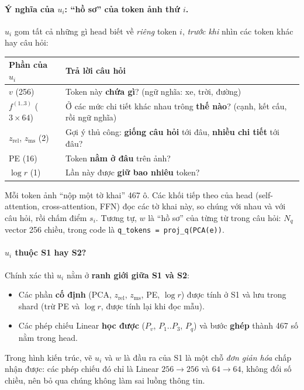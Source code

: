 \documentclass[11pt,a4paper]{article}
\newcommand{\file}[1]{\texttt{\small #1}}
\begin{document}
\paragraph{Ý nghĩa của $u_i$: ``hồ sơ'' của token ảnh thứ $i$.} $u_i$ gom tất cả những gì head biết về \emph{riêng} token $i$, \emph{trước khi} nhìn các token khác hay câu hỏi:
\begin{center}
\begin{tabular}{@{}lp{9.5cm}@{}}
\toprule
Phần của $u_i$ & Trả lời câu hỏi\\
\midrule
$v$ (256) & Token này \textbf{chứa gì}? (ngữ nghĩa: xe, trời, đường)\\
$f^{(1..3)}$ ($3\times64$) & Ở các mức chi tiết khác nhau trông \textbf{thế nào}? (cạnh, kết cấu, rồi ngữ nghĩa)\\
$z_\text{rel}$, $z_\text{ms}$ (2) & Gợi ý thủ công: \textbf{giống câu hỏi} tới đâu, \textbf{nhiều chi tiết} tới đâu?\\
PE (16) & Token \textbf{nằm ở đâu} trên ảnh?\\
$\log r$ (1) & Lần này được \textbf{giữ bao nhiêu} token?\\
\bottomrule
\end{tabular}
\end{center}

\begin{trucgiac}
Mỗi token ảnh ``nộp một tờ khai'' 467 ô. Các khối tiếp theo của head (self-attention, cross-attention, FFN) đọc các tờ khai này, so chúng với nhau và với câu hỏi, rồi chấm điểm $s_i$. Tương tự, $w$ là ``hồ sơ'' của từng từ trong câu hỏi: $N_q$ vector 256 chiều, trong code là \file{q\_tokens = proj\_q(PCA(e))}.
\end{trucgiac}

\paragraph{$u_i$ thuộc S1 hay S2?} Chính xác thì $u_i$ nằm ở \textbf{ranh giới giữa S1 và S2}:
\begin{itemize}[leftmargin=*]
\item Các phần \textbf{cố định} (PCA, $z_\text{rel}$, $z_\text{ms}$, PE, $\log r$) được tính ở S1 và lưu trong shard (trừ PE và $\log r$, được tính lại khi đọc mẫu).
\item Các phép chiếu Linear \textbf{học được} ($P_v$, $P_1..P_3$, $P_q$) và bước \textbf{ghép} thành 467 số nằm trong head.
\end{itemize}
Trong hình kiến trúc, vẽ $u_i$ và $w$ là đầu ra của S1 là một chỗ \emph{đơn giản hóa} chấp nhận được: các phép chiếu đó chỉ là Linear $256\to256$ và $64\to64$, không đổi số chiều, nên bỏ qua chúng không làm sai luồng thông tin.
\end{document}
